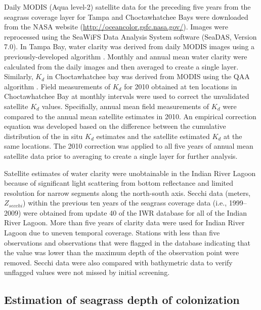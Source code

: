 \documentclass[letterpaper,12pt,oneside]{article}\usepackage[]{graphicx}\usepackage[]{color}
\begin{document}
Daily MODIS (Aqua level-2) satellite data for the preceding five years from the seagrass coverage layer for Tampa and Choctawhatchee Bays were downloaded from the NASA website (\url{http://oceancolor.gsfc.nasa.gov/}). Images were reprocessed using the SeaWiFS Data Analysis System software (SeaDAS, Version 7.0). In Tampa Bay, water clarity was derived from daily MODIS images using a previously-developed algorithm \citep{Chen07}. Monthly and annual mean water clarity were calculated from the daily images and then averaged to create a single layer. Similarly, $K_d$ in Choctawhatchee bay was derived from MODIS using the QAA algorithm \citep{Lee05}.  Field measurements of $K_d$ for 2010 obtained at ten locations in Choctawhatchee Bay at monthly intervals were used to correct the unvalidated satellite $K_d$ values.  Specifially, annual mean field measurements of $K_d$ were compared to the annual mean satellite estimates in 2010.  An empirical correction equation was developed based on the difference between the cumulative distribution of the in situ $K_d$ estimates and the satellite estimated $K_d$ at the same locations.  The 2010 correction was applied to all five years of annual mean satellite data prior to averaging to create a single layer for further analysis.

Satellite estimates of water clarity were unobtainable in the Indian River Lagoon because of significant light scattering from bottom reflectance and limited resolution for narrow segments along the north-south axis.  Secchi data (meters, $Z_{secchi}$) within the previous ten years of the seagrass coverage data (i.e., 1999--2009) were obtained from update 40 of the \ac{IWR} database for all of the Indian River Lagoon.  More than five years of clarity data were used for Indian River Lagoon due to uneven temporal coverage.  Stations with less than five observations and observations that were flagged in the database indicating that the value was lower than the maximum depth of the observation point were removed.  Secchi data were also compared with bathymetric data to verify unflagged values were not missed by initial screening. 

\subsection{Estimation of seagrass depth of colonization} \label{sec:est_method}
\end{document}
